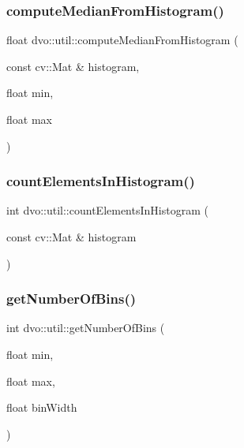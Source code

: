 \mbox{\label{namespacedvo_1_1util_af0fef1368b12563b7e623482aef1725a}} 
\subsubsection{\texorpdfstring{compute\+Median\+From\+Histogram()}{computeMedianFromHistogram()}}
{\footnotesize\ttfamily float dvo\+::util\+::compute\+Median\+From\+Histogram (\begin{DoxyParamCaption}\item[{const cv\+::\+Mat \&}]{histogram,  }\item[{float}]{min,  }\item[{float}]{max }\end{DoxyParamCaption})}

\mbox{\label{namespacedvo_1_1util_a1978d9c686a6ed8e7d373bd922b58deb}} 
\subsubsection{\texorpdfstring{count\+Elements\+In\+Histogram()}{countElementsInHistogram()}}
{\footnotesize\ttfamily int dvo\+::util\+::count\+Elements\+In\+Histogram (\begin{DoxyParamCaption}\item[{const cv\+::\+Mat \&}]{histogram }\end{DoxyParamCaption})}

\mbox{\label{namespacedvo_1_1util_a3523b38b32b8f623b5aeff6e7c4339cb}} 
\subsubsection{\texorpdfstring{get\+Number\+Of\+Bins()}{getNumberOfBins()}}
{\footnotesize\ttfamily int dvo\+::util\+::get\+Number\+Of\+Bins (\begin{DoxyParamCaption}\item[{float}]{min,  }\item[{float}]{max,  }\item[{float}]{bin\+Width }\end{DoxyParamCaption})}

